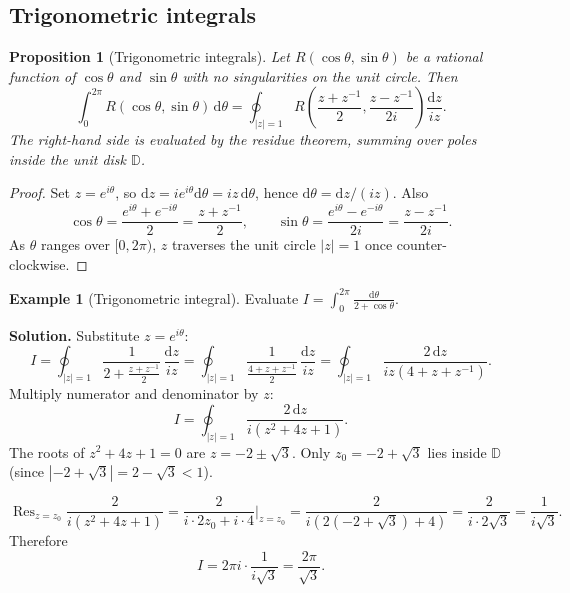 \documentclass[12pt,a4paper,openany]{book}
\theoremstyle{definition}
\newtheorem{example}[definition]{Example}
\theoremstyle{plain}
\newtheorem{proposition}[definition]{Proposition}
\theoremstyle{remark}
\newcommand{\D}{\mathbb{D}}
\DeclareMathOperator{\Res}{Res}
\newcommand{\dd}{\mathrm{d}}
\newcommand{\abs}[1]{\left|#1\right|}
\begin{document}
\subsection{Trigonometric integrals}
\label{ssec:trig-integrals}

\begin{proposition}[Trigonometric integrals]\label{prop:trig-integral}
Let $R(\cos\theta,\sin\theta)$ be a rational function of $\cos\theta$
and $\sin\theta$ with no singularities on the unit circle.  Then
\[
  \int_0^{2\pi}R(\cos\theta,\sin\theta)\,\dd\theta
  =\oint_{\abs{z}=1}R\!\left(\frac{z+z^{-1}}{2},
  \frac{z-z^{-1}}{2i}\right)\frac{\dd z}{iz}.
\]
The right-hand side is evaluated by the residue theorem, summing over
poles inside the unit disk $\D$.
\end{proposition}

\begin{proof}
Set $z=e^{i\theta}$, so $\dd z=ie^{i\theta}\dd\theta=iz\,\dd\theta$,
hence $\dd\theta=\dd z/(iz)$.  Also
\[
  \cos\theta=\frac{e^{i\theta}+e^{-i\theta}}{2}=\frac{z+z^{-1}}{2},
  \qquad
  \sin\theta=\frac{e^{i\theta}-e^{-i\theta}}{2i}=\frac{z-z^{-1}}{2i}.
\]
As $\theta$ ranges over $[0,2\pi)$, $z$ traverses the unit circle
$\abs{z}=1$ once counter-clockwise.
\end{proof}

\begin{example}[Trigonometric integral]\label{ex:trig-1}
Evaluate $\displaystyle I=\int_0^{2\pi}\frac{\dd\theta}{2+\cos\theta}$.

\medskip\noindent\textbf{Solution.}
Substitute $z=e^{i\theta}$:
\[
  I=\oint_{\abs{z}=1}\frac{1}{2+\frac{z+z^{-1}}{2}}\,\frac{\dd z}{iz}
  =\oint_{\abs{z}=1}\frac{1}{\frac{4+z+z^{-1}}{2}}\,\frac{\dd z}{iz}
  =\oint_{\abs{z}=1}\frac{2\,\dd z}{iz(4+z+z^{-1})}.
\]
Multiply numerator and denominator by $z$:
\[
  I=\oint_{\abs{z}=1}\frac{2\,\dd z}{i(z^2+4z+1)}.
\]
The roots of $z^2+4z+1=0$ are $z=-2\pm\sqrt{3}$.
Only $z_0=-2+\sqrt{3}$ lies inside $\D$ (since $\abs{-2+\sqrt{3}}
=2-\sqrt{3}<1$).

\[
  \Res_{z=z_0}\frac{2}{i(z^2+4z+1)}
  =\frac{2}{i\cdot 2z_0+i\cdot 4}\bigg|_{z=z_0}
  =\frac{2}{i(2(-2+\sqrt{3})+4)}
  =\frac{2}{i\cdot 2\sqrt{3}}=\frac{1}{i\sqrt{3}}.
\]
Therefore
\[
  I=2\pi i\cdot\frac{1}{i\sqrt{3}}=\frac{2\pi}{\sqrt{3}}.
\]
\end{example}
\end{document}
